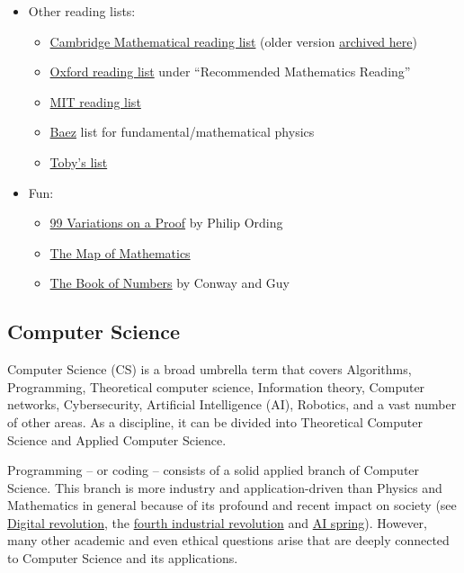 \documentclass{article}
\begin{document}
\begin{itemize}
    \item Other reading lists:
    \begin{itemize}
        \item \href{https://www.maths.cam.ac.uk/undergrad/admissions/files/admissions/reading-list.pdf}{Cambridge Mathematical reading list}  (older version \href{https://web.archive.org/web/20210618105354/https://www.maths.cam.ac.uk/undergrad/admissions/files/reading-list.pdf}{archived here})
        \item \href{https://www.maths.ox.ac.uk/study-here/undergraduate-study/prospectus}{Oxford reading list} under ``Recommended Mathematics Reading''
        \item \href{https://math.mit.edu/research/highschool/primes/reading.php}{MIT reading list}
        \item \href{http://math.ucr.edu/home/baez/books.html}{Baez} list for fundamental/mathematical physics
        \item \href{https://www.youtube.com/watch?v=I_Df_mx8Hxo}{Toby's list}
    \end{itemize}
    
    \item Fun:
    \begin{itemize}
        \item \href{https://www.goodreads.com/en/book/show/40000474-99-variations-on-a-proof}{99 Variations on a Proof} by Philip Ording
        \item \href{https://www.youtube.com/watch?v=OmJ-4B-mS-Y}{The Map of Mathematics}
        \item \href{https://www.goodreads.com/book/show/682027.The_Book_of_Numbers}{The Book of Numbers} by Conway and Guy
    \end{itemize}
    
    
\end{itemize}

\subsection{Computer Science}

Computer Science (CS) is a broad umbrella term that covers Algorithms, Programming, Theoretical computer science, Information theory, Computer networks, Cybersecurity, Artificial Intelligence (AI), Robotics, and a vast number of other areas.
As a discipline, it can be divided into Theoretical Computer Science and Applied Computer Science. 

Programming -- or coding -- consists of a solid applied branch of Computer Science.
This branch is more industry and application-driven than Physics and Mathematics in general because of its profound and recent impact on society (see \href{https://en.wikipedia.org/wiki/Digital_Revolution}{Digital revolution}, the  \href{https://www.weforum.org/agenda/2016/01/the-fourth-industrial-revolution-what-it-means-and-how-to-respond/}{fourth industrial revolution} and \href{https://en.wikipedia.org/wiki/AI_boom}{AI spring}).
However, many other academic and even ethical questions arise that are deeply connected to Computer Science and its applications.
\end{document}
